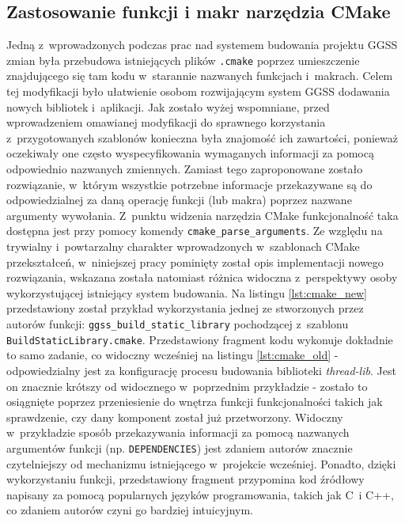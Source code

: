 \subsection{Zastosowanie funkcji i makr narzędzia CMake}
Jedną z~wprowadzonych podczas prac nad systemem budowania projektu GGSS zmian była przebudowa istniejących plików \lstinline{.cmake} poprzez umieszczenie znajdującego się tam kodu w~starannie nazwanych funkcjach i~makrach. Celem tej modyfikacji było ułatwienie osobom rozwijającym system GGSS dodawania nowych bibliotek i~aplikacji. Jak zostało wyżej wspomniane, przed wprowadzeniem omawianej modyfikacji do sprawnego korzystania z~przygotowanych szablonów konieczna była znajomość ich zawartości, ponieważ oczekiwały one często wyspecyfikowania wymaganych informacji za pomocą odpowiednio nazwanych zmiennych. Zamiast tego zaproponowane zostało rozwiązanie, w~którym wszystkie potrzebne informacje przekazywane są do odpowiedzialnej za daną operację funkcji (lub makra) poprzez nazwane argumenty wywołania. Z~punktu widzenia narzędzia CMake funkcjonalność taka dostępna jest przy pomocy komendy \lstinline{cmake_parse_arguments}. Ze względu na trywialny i~powtarzalny charakter wprowadzonych w~szablonach CMake przekształceń, w~niniejszej pracy pominięty został opis implementacji nowego rozwiązania, wskazana została natomiast różnica widoczna z~perspektywy osoby wykorzystującej istniejący system budowania. Na listingu \ref{lst:cmake_new} przedstawiony został przykład wykorzystania jednej ze stworzonych przez autorów funkcji: \lstinline{ggss_build_static_library} pochodzącej z~szablonu \lstinline{BuildStaticLibrary.cmake}. Przedstawiony fragment kodu wykonuje dokładnie to samo zadanie, co widoczny wcześniej na listingu \ref{lst:cmake_old} - odpowiedzialny jest za konfigurację procesu budowania biblioteki \emph{thread-lib}. Jest on znacznie krótszy od widocznego w~poprzednim przykładzie - zostało to osiągnięte poprzez przeniesienie do wnętrza funkcji funkcjonalności takich jak sprawdzenie, czy dany komponent został już przetworzony. Widoczny w~przykładzie sposób przekazywania informacji za pomocą nazwanych argumentów funkcji (np. \lstinline{DEPENDENCIES}) jest zdaniem autorów znacznie czytelniejszy od mechanizmu istniejącego w~projekcie wcześniej. Ponadto, dzięki wykorzystaniu funkcji, przedstawiony fragment przypomina kod źródłowy napisany za pomocą popularnych języków programowania, takich jak C~i C++, co zdaniem autorów czyni go bardziej intuicyjnym.



